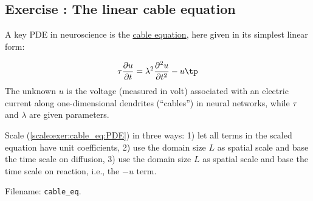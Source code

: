 \documentclass[graybox,envcountchap,sectrefs,final]{svmonodo}
\newenvironment{doconceexercise}{}{}
\newcounter{doconceexercisecounter}
\begin{document}
\begin{doconceexercise}

\subsection*{Exercise \thedoconceexercisecounter: The linear cable equation}

\label{scale:exer:cable_eq}

A key PDE in neuroscience is the \href{{https://en.wikipedia.org/wiki/Cable_theory}}{cable equation}, here given in its simplest linear form:

\begin{equation}
\tau\frac{\partial u}{\partial t} = \lambda^2\frac{\partial^2 u}{\partial t^2}
-u\tp
\label{scale:exer:cable_eq:PDE}
\end{equation}
The unknown $u$ is the voltage (measured in volt) associated with
an electric current along one-dimensional dendrites (``cables'')
in neural networks, while $\tau$ and $\lambda$ are given parameters.

Scale (\ref{scale:exer:cable_eq:PDE}) in three ways: 1) let all terms in
the scaled equation have unit coefficients, 2) use the domain size
$L$ as spatial scale and base the time scale on diffusion, 3) use the
domain size $L$ as spatial scale and base the time scale on
reaction, i.e., the $-u$ term.


\noindent Filename: \Verb!cable_eq!.

\end{doconceexercise}
\end{document}
